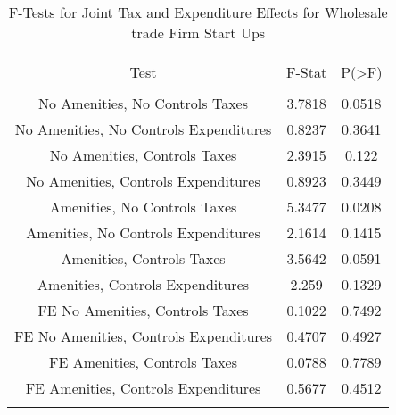 
\begin{table}[!htbp] \centering 
  \caption{F-Tests for Joint Tax and Expenditure Effects for Wholesale trade Firm Start Ups} 
  \label{42Ftests} 
\begin{tabular}{@{\extracolsep{5pt}} ccc} 
\\[-1.8ex]\hline 
\hline \\[-1.8ex] 
Test & F-Stat & P(\textgreater F) \\ 
\hline \\[-1.8ex] 
No Amenities, No Controls Taxes & 3.7818 & 0.0518 \\ 
No Amenities, No Controls Expenditures & 0.8237 & 0.3641 \\ 
No Amenities, Controls Taxes & 2.3915 & 0.122 \\ 
No Amenities, Controls Expenditures & 0.8923 & 0.3449 \\ 
Amenities, No Controls Taxes & 5.3477 & 0.0208 \\ 
Amenities, No Controls Expenditures & 2.1614 & 0.1415 \\ 
Amenities, Controls Taxes & 3.5642 & 0.0591 \\ 
Amenities, Controls Expenditures & 2.259 & 0.1329 \\ 
FE No Amenities, Controls Taxes & 0.1022 & 0.7492 \\ 
FE No Amenities, Controls Expenditures & 0.4707 & 0.4927 \\ 
FE Amenities, Controls Taxes & 0.0788 & 0.7789 \\ 
FE Amenities, Controls Expenditures & 0.5677 & 0.4512 \\ 
\hline \\[-1.8ex] 
\end{tabular} 
\end{table} 
